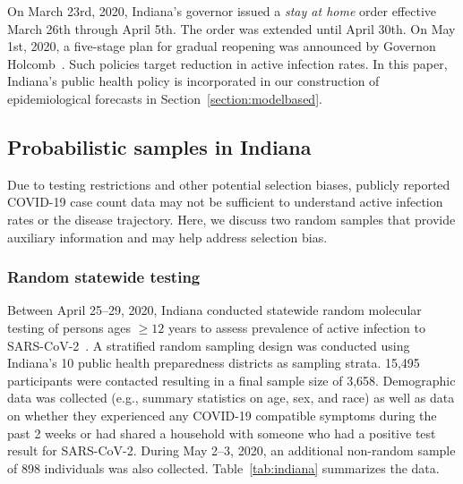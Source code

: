 \documentclass[11pt]{amsart}
\numberwithin{equation}{section}
\theoremstyle{plain}
\begin{document}
 On March 23rd, 2020, Indiana's governor issued a \emph{stay at home} order effective March 26th through April 5th.  The order was extended until April 30th. On May 1st, 2020, a five-stage plan for gradual reopening was announced by Governon Holcomb~\citep{fivestageplan}.  Such policies target reduction in active infection rates. In this paper, Indiana's public health policy is incorporated in our construction of epidemiological forecasts in Section~\ref{section:modelbased}.


 \subsection{Probabilistic samples in Indiana}

 Due to testing restrictions and other potential selection biases, publicly reported COVID-19 case count data may not be sufficient to understand active infection rates or the disease trajectory.  Here, we discuss two random samples that provide auxiliary information and may help address selection bias.

 \subsubsection{Random statewide testing}

 Between April 25--29, 2020, Indiana conducted statewide random molecular testing of persons ages $\geq 12$ years to assess prevalence of active infection to SARS-CoV-2~\citep{Yiannoutsos2021}. A stratified random sampling design was conducted using Indiana’s 10 public health preparedness districts as sampling strata. 15,495 participants were contacted resulting in a final sample size of 3,658. Demographic data was collected (e.g., summary statistics on age, sex, and race) as well as data on whether they experienced any COVID-19 compatible symptoms during the past 2 weeks or had shared a household with someone who had a positive test result for SARS-CoV-2. During May 2--3, 2020, an additional non-random sample of 898 individuals was also collected.
 Table~\ref{tab:indiana} summarizes the data.
\end{document}
